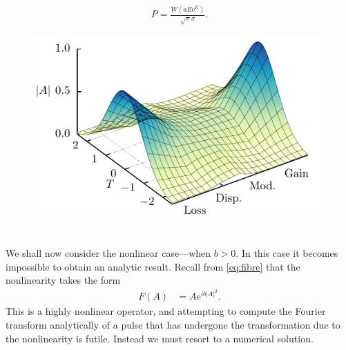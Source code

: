 \documentclass[10pt,twocolumn,a4paper]{article}
\begin{document}
\begin{align}
P = \frac{W(a E \textrm{e}^E)}{\sqrt{\pi} \sigma}.
\label{eq:equilpower}
\end{align}


\begin{figure}
\centering
\includegraphics{Evo}
\caption{}
\label{fig:}
\end{figure}


\section{}
We shall now consider the nonlinear case---when $b > 0$. In this case it becomes impossible to obtain an analytic result. Recall from \eqref{eq:fibre} that the nonlinearity takes the form
\begin{align*}
F(A) &= A \textrm{e}^{i b |A|^2}.
\end{align*}
This is a highly nonlinear operator, and attempting to compute the Fourier transform analytically of a pulse that has undergone the transformation due to the nonlinearity is futile. Instead we must resort to a numerical solution.
\end{document}
